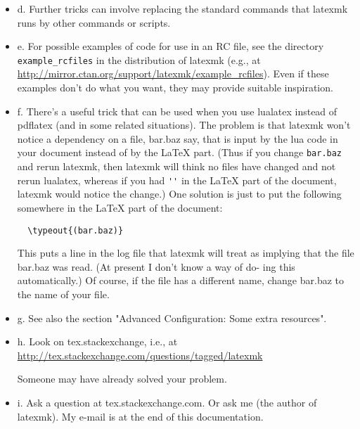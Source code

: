 \begin{itemize}
\item d. Further tricks can involve replacing the standard commands that
        latexmk runs by other commands or scripts.

\item e.  For possible examples of code for use in an RC file, see the
directory  \verb|example_rcfiles|  in  the  distribution  of  latexmk   (e.g.,
at
\url{http://mirror.ctan.org/support/latexmk/example_rcfiles}).
Even if these examples don't do what you want, they may provide suitable
                inspiration.

\item f. There's a useful trick that can be used when you  use  lualatex
instead  of  pdflatex  (and  in some related situations).  The problem
is that latexmk won't notice a dependency on a file, bar.baz
say, that  is input  by  the  lua code in your document instead
of by the LaTeX part.  (Thus if you change \verb|bar.baz| and
rerun latexmk, then latexmk will  think no  files have changed
and not rerun lualatex, whereas if you had
\verb|''| in the LaTeX part of the document,
latexmk  would  notice the change.)   One  solution is just to
put the following somewhere in the LaTeX part of the document:

\begin{verbatim}
  \typeout{(bar.baz)}
\end{verbatim}

This puts a line in the log file that latexmk will  treat  as  implying
that  the file bar.baz was read.  (At present I don't know a way of do-
ing this automatically.)  Of course, if the file has a different  name,
change bar.baz to the name of your file.

\item g. See also the section "Advanced Configuration: Some extra resources".

\item h.    Look on tex.stackexchange, i.e., at   
        \url{http://tex.stackexchange.com/questions/tagged/latexmk}  

Someone may  have  already  solved your problem.

\item i. Ask a question at tex.stackexchange.com.
Or ask me (the author of latexmk).  My e-mail is at the end of this
documentation.

\end{itemize}



